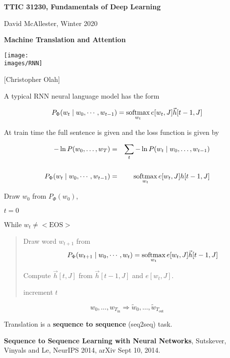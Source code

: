 




{\Huge

  \centerline{\bf TTIC 31230, Fundamentals of Deep Learning}
  \bigskip
  \centerline{David McAllester, Winter 2020}
  \vfill
  \centerline{\bf Machine Translation and Attention}


\centerline{\texttt{[image: \\images/RNN]}}
\centerline{{\large [Christopher Olah]}}

\vfill
A typical RNN neural language model has the form

$$P_\Phi(w_t\;|\;w_0,\cdots,w_{t-1}) = \operatorname*{softmax}_{w_t} e[w_t,J]\vec{h}[t-1,J]$$


At train time the full sentence is given and the loss function is given by

\begin{eqnarray*}
-\ln P(w_0,\ldots,w_T) & = & \sum_t -\ln P(w_t\;|\;w_0,\ldots,w_{t-1}) \\
\\
P_\Phi(w_t\;|\;w_0,\cdots,w_{t-1}) & = & \operatorname*{softmax}_{w_t} e[w_t,J]h[t-1,J]
\end{eqnarray*}


Draw $w_0$ from $P_\Phi(w_0)$,

$t = 0$

While $w_t \not = \mathrm{<EOS>}$

\begin{quotation}
Draw word $w_{t+1}$ from $$~\;\;\;\;\;P_\Phi(w_{t+1}\;|\;w_0,\cdots,w_t) = \operatorname*{softmax}_{w_t} e[w_t,J]\vec{h}[t-1,J]$$

Compute $\vec{h}[t,J]$ from $\vec{h}[t-1,J]$ and $e[w_t,J]$.

\vspace{1ex}
increment $t$
\end{quotation}


$$w_0,\ldots,w_{T_{\mathrm{in}}} \Rightarrow \tilde{w}_0,\ldots,\tilde{w}_{T_{\mathrm{out}}}$$

\vfill
Translation is a {\bf sequence to sequence} (seq2seq) task.

\vfill
{\bf Sequence to Sequence Learning with Neural Networks}, Sutskever, Vinyals and Le, NeurIPS 2014, arXiv Sept 10, 2014.

}
